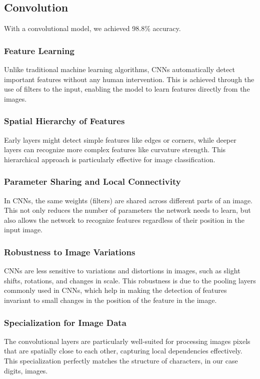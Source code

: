 \documentclass[utf8,1pt]{extarticle} %
\begin{document}
\subsection{Convolution}
With a convolutional model, we achieved
98.8\% accuracy.
\subsubsection{Feature Learning}
Unlike traditional machine learning algorithms,
CNNs automatically detect important features without
 any human intervention. 
 This is achieved through the use of filters to the input, 
 enabling the model to learn features directly 
 from the images.

\subsubsection{Spatial Hierarchy of Features}
Early layers might detect simple features like edges or corners,
 while deeper layers can recognize more complex features 
 like curvature strength.
This hierarchical approach is particularly effective for
image classification.

\subsubsection{Parameter Sharing and Local Connectivity}
In CNNs, the same weights (filters) are shared across
different parts of an image. 
This not only reduces the number of parameters the network
needs to learn, 
but also allows the network to recognize features
regardless of their position in the input image.

\subsubsection{Robustness to Image Variations}
CNNs are less sensitive to variations and distortions 
in images, such as slight shifts, rotations, 
and changes in scale. 
This robustness is due to the pooling layers commonly used
in CNNs, which help in making the detection of features
invariant to small changes in the position of the feature
in the image.

\subsubsection{Specialization for Image Data}
The convolutional layers are particularly well-suited 
for processing images pixels that are spatially close 
to each other, capturing local dependencies effectively.
This specialization perfectly matches the structure of 
characters, in our case digits, images.
\end{document}
